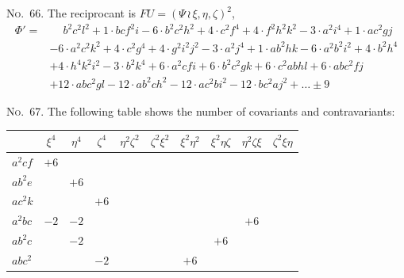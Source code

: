 \documentclass[11pt,a4paper]{article}
\begin{document}
\noindent\textsc{No.~66.} The reciprocant is $FU = (\Psi\, \wr\, \xi, \eta, \zeta)^2$,
\begin{align*}
\Phi' = &\phantom{+} b^2c^2l^2 + 1\cdot bcf^2i - 6\cdot b^2c^2h^2 + 4\cdot c^2f^4 + 4\cdot f^2h^2k^2 - 3\cdot a^2i^4 + 1\cdot ac^2gj\\
& - 6\cdot a^2c^2k^2 + 4\cdot c^2g^4 + 4\cdot g^2i^2j^2 - 3\cdot a^2j^4 + 1\cdot ab^2hk - 6\cdot a^2b^2i^2 + 4\cdot b^2h^4\\
& + 4\cdot h^4k^2i^2 - 3\cdot b^2k^4 + 6\cdot a^2cfi + 6\cdot b^2c^2gk + 6\cdot c^2abhl + 6\cdot abc^2fj\\
& + 12\cdot abc^2gl - 12\cdot ab^2ch^2 - 12\cdot ac^2bi^2 - 12\cdot bc^2aj^2 + \ldots \pm 9
\end{align*}

\clearpage
\noindent\textsc{No.~67.} The following table shows the number of covariants and contravariants:
\begin{center}
\begin{tabular}{lccccccccc}
\toprule
& $\xi^4$ & $\eta^4$ & $\zeta^4$ & $\eta^2\zeta^2$ & $\zeta^2\xi^2$ & $\xi^2\eta^2$ & $\xi^2\eta\zeta$ & $\eta^2\zeta\xi$ & $\zeta^2\xi\eta$ \\
\midrule
$a^2cf$ & $+6$ & & & & & & & & \\
$ab^2e$ & & $+6$ & & & & & & & \\
$ac^2k$ & & & $+6$ & & & & & & \\
$a^2bc$ & $-2$ & $-2$ & & & & & & $+6$ & \\
$ab^2c$ & & $-2$ & & & & & $+6$ & & \\
$abc^2$ & & & $-2$ & & & $+6$ & & & \\
\bottomrule
\end{tabular}
\end{center}
\end{document}
